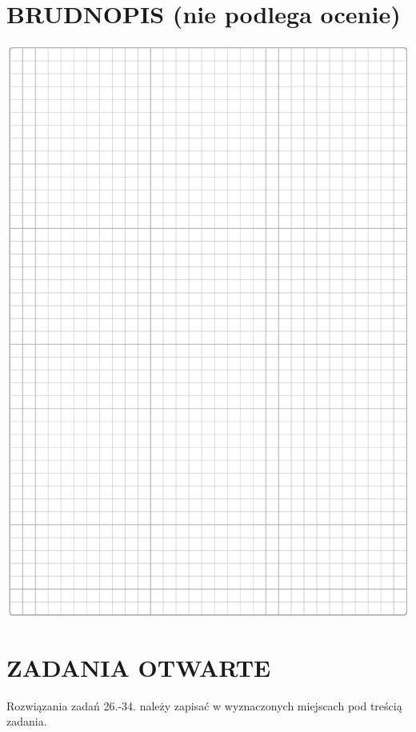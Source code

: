 \documentclass[10pt]{article}
\begin{document}
\section*{BRUDNOPIS (nie podlega ocenie)}
\begin{center}
\includegraphics[max width=\textwidth]{2024_11_21_6574e892c2387ce90f12g-09}
\end{center}

\section*{ZADANIA OTWARTE}
Rozwiązania zadań 26.-34. należy zapisać w wyznaczonych miejscach pod treścią zadania.
\end{document}

